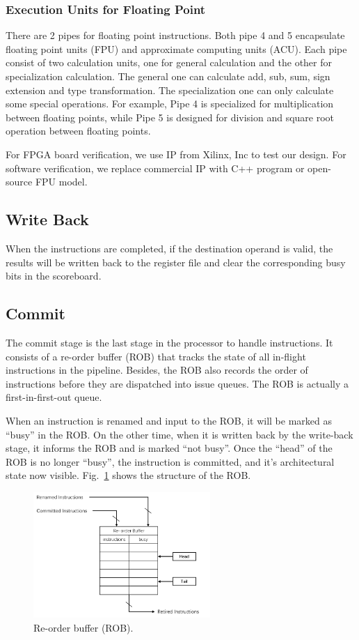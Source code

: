 \subsubsection{Execution Units for Floating Point} %
There are 2 pipes for floating point instructions. Both pipe 4 and 5 encapsulate floating point units (FPU) and approximate computing units (ACU). Each pipe consist of two calculation units, one for general calculation and the other for specialization calculation. The general one can calculate add, sub, sum, sign extension and type transformation. The specialization one can only calculate some special operations. For example, Pipe 4 is specialized for multiplication between floating points, while Pipe 5 is designed for division and square root operation between floating points.

For FPGA board verification, we use IP from Xilinx, Inc to test our design. For software verification, we replace commercial IP with C++ program or open-source FPU model.

\subsection{Write Back} %

When the instructions are completed, if the destination operand is valid, the results will be written back to the register file and clear the corresponding busy bits in the scoreboard.

\subsection{Commit} %
The commit stage is the last stage in the processor to handle instructions. It consists of a re-order buffer (ROB) that tracks the state of all in-flight instructions in the pipeline. Besides, the ROB also records the order of instructions before they are dispatched into issue queues. The ROB is actually a first-in-first-out queue.

When an instruction is renamed and input to the ROB, it will be marked as ``busy'' in the ROB. On the other time, when it is written back by the write-back stage, it informs the ROB and is marked ``not busy''. Once the ``head'' of the ROB is no longer ``busy'', the instruction is committed, and it’s architectural state now visible. Fig.~\ref{fig:rob} shows the structure of the ROB.

\begin{figure}[!htp]
    \centering
    \includegraphics[width=0.6\textwidth]{figure/rob.png}
    \caption{Re-order buffer (ROB).}
    \label{fig:rob}
\end{figure}


